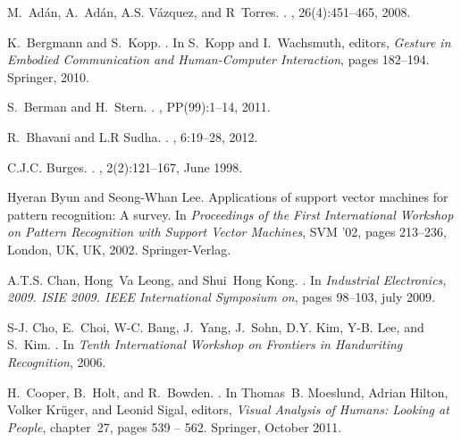 \documentclass[]{article}
\begin{document}
\begin{thebibliography}{10}
M.~Ad{\'a}n, A.~Ad{\'a}n, A.S. V{\'a}zquez, and R~Torres.
.
, 26(4):451--465, 2008.

K.~Bergmann and S.~Kopp.
.
\newblock In S.~Kopp and I.~Wachsmuth, editors, {\em {Gesture in Embodied
  Communication and Human-Computer Interaction}}, pages 182--194. Springer,
  2010.

S.~Berman and H.~Stern.
.
, PP(99):1--14, 2011.

R.~Bhavani and L.R Sudha.
.
, 6:19--28, 2012.

C.J.C. Burges.
.
, 2(2):121--167, June 1998.

Hyeran Byun and Seong-Whan Lee.
\newblock Applications of support vector machines for pattern recognition: A
  survey.
\newblock In {\em Proceedings of the First International Workshop on Pattern
  Recognition with Support Vector Machines}, SVM '02, pages 213--236, London,
  UK, UK, 2002. Springer-Verlag.

A.T.S. Chan, Hong~Va Leong, and Shui~Hong Kong.
.
\newblock In {\em {Industrial Electronics, 2009. ISIE 2009. IEEE International
  Symposium on}}, pages 98--103, july 2009.

S-J. Cho, E.~Choi, W-C. Bang, J.~Yang, J.~Sohn, D.Y. Kim, Y-B. Lee, and S.~Kim.
.
\newblock In {\em {Tenth International Workshop on Frontiers in Handwriting
  Recognition}}, 2006.

H.~Cooper, B.~Holt, and R.~Bowden.
.
\newblock In Thomas~B. Moeslund, Adrian Hilton, Volker Kr{\"u}ger, and Leonid
  Sigal, editors, {\em {Visual Analysis of Humans: Looking at People}},
  chapter~27, pages 539 -- 562. Springer, October 2011.


\end{thebibliography}
\end{document}
